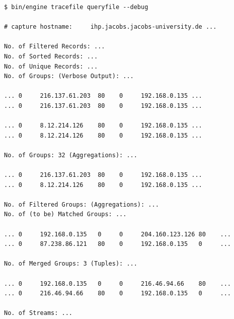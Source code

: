
\begin{lstlisting}
$ bin/engine tracefile queryfile --debug

# capture hostname:     ihp.jacobs.jacobs-university.de ...

No. of Filtered Records: ...
No. of Sorted Records: ...
No. of Unique Records: ...
No. of Groups: (Verbose Output): ...

... 0     216.137.61.203  80    0     192.168.0.135 ...
... 0     216.137.61.203  80    0     192.168.0.135 ...

... 0     8.12.214.126    80    0     192.168.0.135 ...
... 0     8.12.214.126    80    0     192.168.0.135 ...

No. of Groups: 32 (Aggregations): ...

... 0     216.137.61.203  80    0     192.168.0.135 ...
... 0     8.12.214.126    80    0     192.168.0.135 ...

No. of Filtered Groups: (Aggregations): ...
No. of (to be) Matched Groups: ...

... 0     192.168.0.135   0     0     204.160.123.126 80    ...
... 0     87.238.86.121   80    0     192.168.0.135   0     ...

No. of Merged Groups: 3 (Tuples): ...

... 0     192.168.0.135   0     0     216.46.94.66    80    ...
... 0     216.46.94.66    80    0     192.168.0.135   0     ...

No. of Streams: ...
\end{lstlisting}
